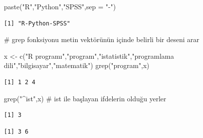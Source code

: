 \documentclass[
  letterpaper,
  DIV=11,
  numbers=noendperiod]{scrreprt}
\newenvironment{Shaded}{\begin{snugshade}}{\end{snugshade}}
\newcommand{\AttributeTok}[1]{\textcolor[rgb]{0.40,0.45,0.13}{#1}}
\newcommand{\CommentTok}[1]{\textcolor[rgb]{0.37,0.37,0.37}{#1}}
\newcommand{\FunctionTok}[1]{\textcolor[rgb]{0.28,0.35,0.67}{#1}}
\newcommand{\NormalTok}[1]{\textcolor[rgb]{0.00,0.23,0.31}{#1}}
\newcommand{\OtherTok}[1]{\textcolor[rgb]{0.00,0.23,0.31}{#1}}
\newcommand{\StringTok}[1]{\textcolor[rgb]{0.13,0.47,0.30}{#1}}
\begin{document}
\begin{Shaded}
\begin{Highlighting}[]
\FunctionTok{paste}\NormalTok{(}\StringTok{"R"}\NormalTok{,}\StringTok{"Python"}\NormalTok{,}\StringTok{"SPSS"}\NormalTok{,}\AttributeTok{sep =} \StringTok{"{-}"}\NormalTok{)}
\end{Highlighting}
\end{Shaded}

\begin{verbatim}
[1] "R-Python-SPSS"
\end{verbatim}

\begin{Shaded}
\begin{Highlighting}[]
\CommentTok{\# grep fonksiyonu metin vektörünün içinde belirli bir deseni arar}

\NormalTok{x }\OtherTok{\textless{}{-}} \FunctionTok{c}\NormalTok{(}\StringTok{"R programı"}\NormalTok{,}\StringTok{"program"}\NormalTok{,}\StringTok{"istatistik"}\NormalTok{,}\StringTok{"programlama dili"}\NormalTok{,}\StringTok{"bilgisayar"}\NormalTok{,}\StringTok{"matematik"}\NormalTok{)}
\FunctionTok{grep}\NormalTok{(}\StringTok{"program"}\NormalTok{,x)}
\end{Highlighting}
\end{Shaded}

\begin{verbatim}
[1] 1 2 4
\end{verbatim}

\begin{Shaded}
\begin{Highlighting}[]
\FunctionTok{grep}\NormalTok{(}\StringTok{"\^{}ist"}\NormalTok{,x) }\CommentTok{\# ist ile başlayan ifdelerin olduğu yerler}
\end{Highlighting}
\end{Shaded}

\begin{verbatim}
[1] 3
\end{verbatim}

\begin{Shaded}
\end{Shaded}

\begin{verbatim}
[1] 3 6
\end{verbatim}
\end{document}
